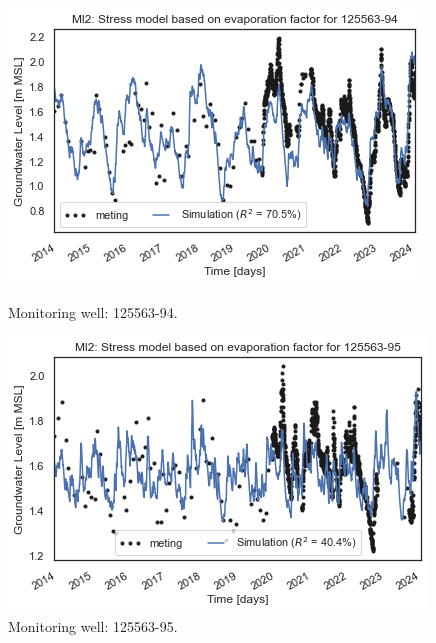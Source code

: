 \begin{figure}[htbp]
    \centering
    \begin{minipage}{0.32\textwidth}
        \centering
        \includegraphics[width=\linewidth]{frontmatter/Heijplaat-fig/125563-94.png}
        \caption{Monitoring well: 125563-94.}
        \label{SM:125563-94}
    \end{minipage}
    \hfill
    \begin{minipage}{0.32\textwidth}
        \centering
        \includegraphics[width=\linewidth]{frontmatter/Heijplaat-fig/125563-95.png}
        \caption{Monitoring well: 125563-95.}
        \label{SM: 125563-95}
    \end{minipage}
    \hfill
    \begin{minipage}{0.32\textwidth}
        \centering

\end{minipage}
\end{figure}
